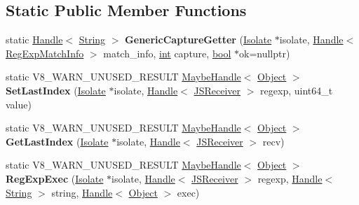 \subsection*{Static Public Member Functions}
\begin{DoxyCompactItemize}
\item 
\mbox{\label{classv8_1_1internal_1_1RegExpUtils_ac466298322eae0f64be0a6bb1c4054a6}} 
static \mbox{\hyperlink{classv8_1_1internal_1_1Handle}{Handle}}$<$ \mbox{\hyperlink{classv8_1_1internal_1_1String}{String}} $>$ {\bfseries Generic\+Capture\+Getter} (\mbox{\hyperlink{classv8_1_1internal_1_1Isolate}{Isolate}} $\ast$isolate, \mbox{\hyperlink{classv8_1_1internal_1_1Handle}{Handle}}$<$ \mbox{\hyperlink{classv8_1_1internal_1_1RegExpMatchInfo}{Reg\+Exp\+Match\+Info}} $>$ match\+\_\+info, \mbox{\hyperlink{classint}{int}} capture, \mbox{\hyperlink{classbool}{bool}} $\ast$ok=nullptr)
\item 
\mbox{\label{classv8_1_1internal_1_1RegExpUtils_af465a5fd4a75868cad30646330492aae}} 
static V8\+\_\+\+W\+A\+R\+N\+\_\+\+U\+N\+U\+S\+E\+D\+\_\+\+R\+E\+S\+U\+LT \mbox{\hyperlink{classv8_1_1internal_1_1MaybeHandle}{Maybe\+Handle}}$<$ \mbox{\hyperlink{classv8_1_1internal_1_1Object}{Object}} $>$ {\bfseries Set\+Last\+Index} (\mbox{\hyperlink{classv8_1_1internal_1_1Isolate}{Isolate}} $\ast$isolate, \mbox{\hyperlink{classv8_1_1internal_1_1Handle}{Handle}}$<$ \mbox{\hyperlink{classv8_1_1internal_1_1JSReceiver}{J\+S\+Receiver}} $>$ regexp, uint64\+\_\+t value)
\item 
\mbox{\label{classv8_1_1internal_1_1RegExpUtils_a9c86a561d27ae20495c0067fd2d02504}} 
static V8\+\_\+\+W\+A\+R\+N\+\_\+\+U\+N\+U\+S\+E\+D\+\_\+\+R\+E\+S\+U\+LT \mbox{\hyperlink{classv8_1_1internal_1_1MaybeHandle}{Maybe\+Handle}}$<$ \mbox{\hyperlink{classv8_1_1internal_1_1Object}{Object}} $>$ {\bfseries Get\+Last\+Index} (\mbox{\hyperlink{classv8_1_1internal_1_1Isolate}{Isolate}} $\ast$isolate, \mbox{\hyperlink{classv8_1_1internal_1_1Handle}{Handle}}$<$ \mbox{\hyperlink{classv8_1_1internal_1_1JSReceiver}{J\+S\+Receiver}} $>$ recv)
\item 
\mbox{\label{classv8_1_1internal_1_1RegExpUtils_a14cc44631a254507b97a3e1234d92e22}} 
static V8\+\_\+\+W\+A\+R\+N\+\_\+\+U\+N\+U\+S\+E\+D\+\_\+\+R\+E\+S\+U\+LT \mbox{\hyperlink{classv8_1_1internal_1_1MaybeHandle}{Maybe\+Handle}}$<$ \mbox{\hyperlink{classv8_1_1internal_1_1Object}{Object}} $>$ {\bfseries Reg\+Exp\+Exec} (\mbox{\hyperlink{classv8_1_1internal_1_1Isolate}{Isolate}} $\ast$isolate, \mbox{\hyperlink{classv8_1_1internal_1_1Handle}{Handle}}$<$ \mbox{\hyperlink{classv8_1_1internal_1_1JSReceiver}{J\+S\+Receiver}} $>$ regexp, \mbox{\hyperlink{classv8_1_1internal_1_1Handle}{Handle}}$<$ \mbox{\hyperlink{classv8_1_1internal_1_1String}{String}} $>$ string, \mbox{\hyperlink{classv8_1_1internal_1_1Handle}{Handle}}$<$ \mbox{\hyperlink{classv8_1_1internal_1_1Object}{Object}} $>$ exec)

\end{DoxyCompactItemize}
